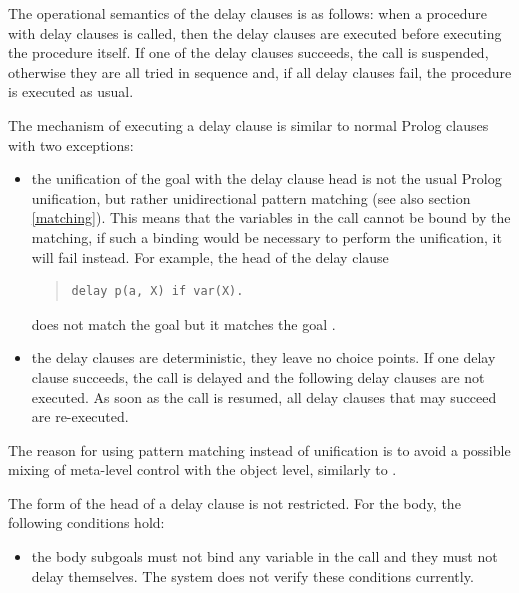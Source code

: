 {%
The operational semantics of the delay clauses is as follows:
when a procedure with delay clauses is called, then the delay
clauses are executed before executing the procedure itself.
If one of the delay clauses succeeds, the call is suspended,
otherwise they are all tried in sequence and,
if all delay clauses fail, the procedure is executed as usual.

The mechanism of executing a delay clause is similar to normal Prolog
clauses with two exceptions:
\begin{itemize}
\item the unification of the goal with the delay clause head is not the usual
Prolog unification, but rather unidirectional pattern matching
(see also section \ref{matching}).
This means that the variables in the call cannot be bound
by the matching, if such a binding would be necessary to
perform the unification, it will fail instead.
For example, the head of the delay clause
\begin{quote}
\begin{verbatim}
delay p(a, X) if var(X).
\end{verbatim}
\end{quote}
does not match the goal  but it matches the goal
.

\item the delay clauses are deterministic, they leave no choice points.
If one delay clause succeeds, the call is delayed and the following delay
clauses are not executed.
As soon as the call is resumed, all delay clauses that may succeed
are re-executed.
\end{itemize}
The reason for using pattern matching instead of unification
is to avoid a possible mixing of meta-level control with the
object level, similarly to \cite{dincbas84}.


The form of the head of a delay clause is not restricted.
For the body, the following conditions hold:

\begin{itemize}
\item the body subgoals must not bind any variable in the call and they
must not delay themselves.
The system does not verify these conditions currently.


\end{itemize}}
